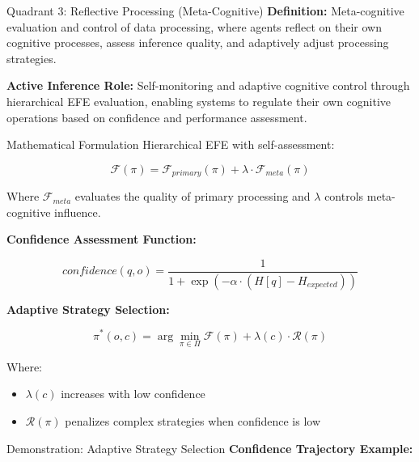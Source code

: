\documentclass[
  ignorenonframetext,
]{beamer}
\providecommand{\tightlist}{%
  \setlength{\itemsep}{0pt}\setlength{\parskip}{0pt}}
\begin{document}
\begin{frame}[fragile]
\begin{block}{Quadrant 3: Reflective Processing (Meta-Cognitive)}
\protect{}\label{sec:quadrant_3}
\textbf{Definition:} Meta-cognitive evaluation and control of data
processing, where agents reflect on their own cognitive processes,
assess inference quality, and adaptively adjust processing strategies.

\textbf{Active Inference Role:} Self-monitoring and adaptive cognitive
control through hierarchical EFE evaluation, enabling systems to
regulate their own cognitive operations based on confidence and
performance assessment.

\begin{block}{Mathematical Formulation}
\protect{}\label{mathematical-formulation-2}
Hierarchical EFE with self-assessment:

\begin{equation}
\mathcal{F}(\pi) = \mathcal{F}_{primary}(\pi) + \lambda \cdot \mathcal{F}_{meta}(\pi)
\label{eq:efe_hierarchical}
\end{equation}

Where \(\mathcal{F}_{meta}\) evaluates the quality of primary processing
and \(\lambda\) controls meta-cognitive influence.

\textbf{Confidence Assessment Function:}

\begin{equation}
confidence(q, o) = \frac{1}{1 + \exp(-\alpha \cdot (H[q] - H_{expected}))}
\label{eq:confidence_assessment}
\end{equation}

\textbf{Adaptive Strategy Selection:}

\begin{equation}
\pi^*(o, c) = \arg\min_{\pi \in \Pi} \mathcal{F}(\pi) + \lambda(c) \cdot \mathcal{R}(\pi)
\label{eq:adaptive_strategy_selection}
\end{equation}

Where:

\begin{itemize}
\tightlist
\item
  \(\lambda(c)\) increases with low confidence
\item
  \(\mathcal{R}(\pi)\) penalizes complex strategies when confidence is
  low
\end{itemize}
\end{block}

\begin{block}{Demonstration: Adaptive Strategy Selection}
\protect{}\label{demonstration-adaptive-strategy-selection}
\textbf{Confidence Trajectory Example:}


\end{block}
\end{block}
\end{frame}
\end{document}

